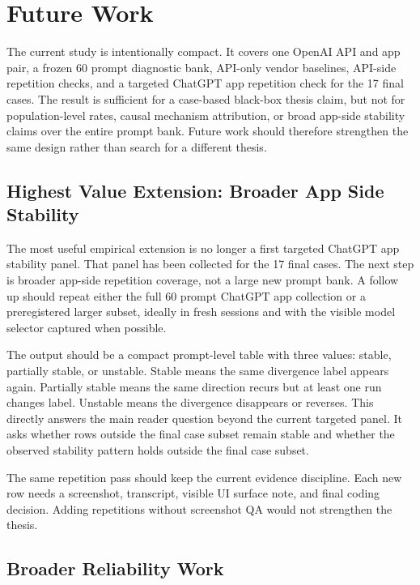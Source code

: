 \chapter{Future Work}

The current study is intentionally compact. It covers one OpenAI API and app
pair, a frozen
60 prompt diagnostic bank, API-only vendor baselines, API-side repetition
checks, and a targeted ChatGPT app repetition check for the 17 final cases. The
result is sufficient for a case-based black-box thesis claim, but not for
population-level rates, causal mechanism attribution, or broad app-side stability
claims over the entire prompt bank. Future work should therefore strengthen the
same design rather than search for a different thesis.

\section{Highest Value Extension: Broader App Side Stability}

The most useful empirical extension is no longer a first targeted ChatGPT app
stability panel. That panel has been collected for the 17 final cases. The next
step is broader app-side repetition coverage, not a large new prompt bank. A
follow up should repeat either the full 60 prompt ChatGPT app collection or a
preregistered larger subset, ideally in fresh sessions and with the visible
model selector captured when possible.

The output should be a compact prompt-level table with three values: stable,
partially stable, or
unstable. Stable means the same divergence label appears again. Partially stable
means the same direction recurs but at least one run changes label. Unstable
means the divergence disappears or reverses. This directly answers the main
reader question beyond the current targeted panel. It asks whether rows outside
the final case subset remain stable and whether the observed stability pattern
holds outside the final case subset.

The same repetition pass should keep the current evidence discipline. Each new
row needs a screenshot, transcript, visible UI surface note, and final coding
decision. Adding repetitions without screenshot QA would not strengthen the
thesis.

\section{Broader Reliability Work}

